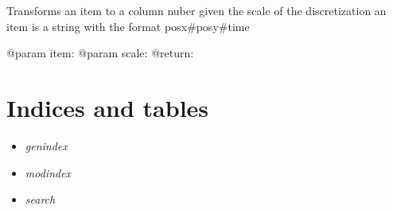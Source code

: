 \documentclass[letterpaper,10pt,english]{sphinxmanual}
\begin{document}

\begin{fulllineitems}
\label{index:SuperHub.Util.item_to_column}
Transforms an item to a column nuber given the scale of the discretization
an item is a string with the format posx\#posy\#time

@param item:
@param scale:
@return:

\end{fulllineitems}



\chapter{Indices and tables}
\label{index:indices-and-tables}\begin{itemize}
\item {} 
\emph{genindex}

\item {} 
\emph{modindex}

\item {} 
\emph{search}

\end{itemize}
\end{document}
